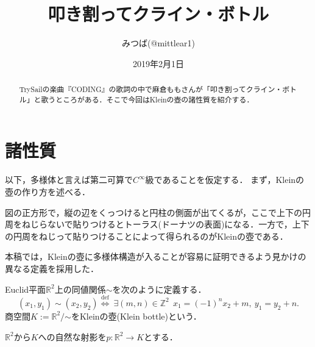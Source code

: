\documentclass[uplatex]{jsarticle}
\begin{document}
\title{叩き割ってクライン・ボトル}
\author{みつば(@mittlear1)}
\date{2019年2月1日}
\maketitle
\begin{abstract}
  TrySailの楽曲『CODING』の歌詞の中で麻倉ももさんが「叩き割ってクライン・ボトル」と歌うところがある．そこで今回はKleinの壺の諸性質を紹介する．
\end{abstract}
\section{諸性質}
以下，多様体と言えば第二可算で$C^\infty$級であることを仮定する．
まず，Kleinの壺の作り方を述べる．
\begin{center}
\end{center}

図の正方形で，縦の辺をくっつけると円柱の側面が出てくるが，ここで上下の円周をねじらないで貼りつけるとトーラス(ドーナツの表面)になる．一方で，上下の円周をねじって貼りつけることによって得られるのがKleinの壺である．

本稿では，Kleinの壺に多様体構造が入ることが容易に証明できるよう見かけの異なる定義を採用した．
\begin{definition}\label{Klein}
  Euclid平面$\mathbb{R}^2$上の同値関係$\sim$を次のように定義する．
  \[ (x_1,y_1)\sim (x_2,y_2)\overset{\mathrm{def}}{\Leftrightarrow}\ \exists (m,n)\in \mathbb{Z}^2\ \ x_1=(-1)^nx_2+m,\ y_1=y_2+n.  \]
  商空間$K:=\mathbb{R}^2/\mathord{\sim}$をKleinの壺(Klein bottle)という．
\end{definition}

$\mathbb{R}^2$から$K$への自然な射影を$p\colon \mathbb{R}^2\to K$とする．
\end{document}

